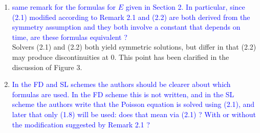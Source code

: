 \documentclass{article}
\begin{document}
\begin{enumerate}
    \item \textcolor{blue}{same remark for the formulas for $E$ given in Section 2. In particular,
since (2.1) modified according to Remark 2.1 and (2.2) are both derived from the symmetry assumption and they both involve a constant that depends on time, are these formulas equivalent ?} \\ 
Solvers (2.1) and (2.2) both yield symmetric solutions, but differ in that (2.2) may produce discontinuities at 0. This point has been clarified in the discussion of Figure 3. 
    \item \textcolor{blue}{In the FD and SL schemes the authors should be clearer about which formulas are used.
In the FD scheme this is not written, and in the SL scheme the authors write that
the Poisson equation is solved using (2.1), and later that only (1.8) will be used:
does that mean via (2.1) ? With or without the modification suggested by Remark 2.1 ? } \\ 

\end{enumerate}
\end{document}
